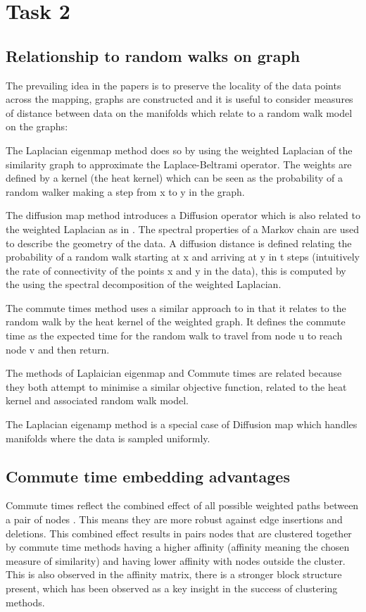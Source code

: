 \documentclass[12pt]{article} %
\begin{document}
\section{Task 2}
\subsection{Relationship to random walks on graph}
The prevailing idea in the papers is to preserve the locality of the data points across the mapping, graphs are constructed and it is useful to consider measures of distance between data on the manifolds which relate to a random walk model on the graphs:

The Laplacian eigenmap method \cite{laplacianEigenmap} does so by using the weighted Laplacian of the similarity graph to approximate the Laplace-Beltrami operator. The weights are defined by a kernel (the heat kernel) which can be seen as the probability of a random walker making a step from x to y in the graph.

The diffusion map method \cite{diffusionMap} introduces a Diffusion operator which is also related to the weighted Laplacian as in \cite{laplacianEigenmap}. The spectral properties of a Markov chain are used to describe the geometry of the data. A diffusion distance is defined relating the probability of a random walk starting at x and arriving at y in t steps (intuitively the rate of connectivity of the points x and y in the data), this is computed by the using the spectral decomposition of the weighted Laplacian.

The commute times method \cite{commuteTime} uses a similar approach to \cite{laplacianEigenmap} in that it relates to the random walk by the heat kernel of the weighted graph. It defines the commute time as the expected time for the
random walk to travel from node u to reach node v and then
return.

The methods of Laplaician eigenmap \cite{laplacianEigenmap} and Commute times \cite{commuteTime} are related because they both attempt to minimise a similar objective function, related to the heat kernel and associated random walk model.

The Laplacian eigenamp \cite{laplacianEigenmap} method is a special case of Diffusion map \cite{diffusionMap} which handles manifolds where the data is sampled uniformly.

\subsection{Commute time embedding advantages}
Commute times reflect the combined effect of all possible weighted paths between a pair of nodes \cite{commuteTime}. This means they are more robust against edge insertions and deletions. This combined effect results in pairs nodes that are clustered together by commute time methods having a higher affinity (affinity meaning the chosen measure of similarity) and having lower affinity with nodes outside the cluster. This is also observed in the affinity matrix, there is a stronger block structure present, which has been observed as a key insight in the success of clustering methods.
\end{document}
